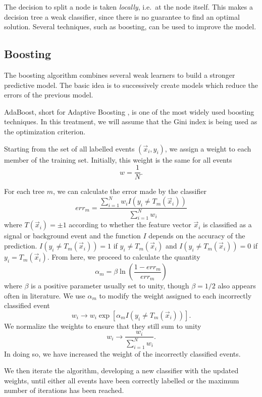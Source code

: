 \documentclass[10pt,a4paper]{book}
\begin{document}
The decision to split a node is taken \emph{locally}, i.e.\ at the node itself. This makes a decision tree a weak classifier, since there is no guarantee to find an optimal solution. Several techniques, such as boosting, can be used to improve the model. 

\subsection{Boosting}
The boosting algorithm combines several weak learners to build a stronger predictive model. The basic idea is to successively create models which reduce the errors of the previous model. 

AdaBoost, short for Adaptive Boosting \cite{Freund1996ExperimentsWA}, is one of the most widely used boosting techniques. In this treatment, we will assume that the Gini index is being used as the optimization criterion.

Starting from the set of all labelled events $(\vec{x}_i, y_i)$, we assign a weight to each member of the training set. Initially, this weight is the same for all events
\begin{equation}
w = \frac{1}{N}.
\end{equation}

For each tree $m$, we can calculate the error made by the classifier
\begin{equation}
err_m = \frac{\sum_{i= 1}^N w_i I(y_i \neq T_m(\vec{x}_i))}{\sum_{i =1}^N w_i}
\label{error}
\end{equation}
where $T(\vec{x}_i) = \pm 1$ according to whether the feature vector $\vec{x}_i$ is classified as a signal or background event and the function $I$ depends on the accuracy of the prediction. $I(y_i \neq T_m(\vec{x}_i)) = 1$ if $y_i \neq T_m(\vec{x}_i)$ and $I(y_i \neq T_m(\vec{x}_i)) = 0$ if $y_i = T_m(\vec{x}_i)$.
From here, we proceed to calculate the quantity
\begin{equation}
\alpha_m = \beta \ln \left( \frac{1 - err_m}{err_m} \right)
\end{equation}
where $\beta$ is a positive parameter usually set to unity, though $\beta = 1/2$ also appears often in literature. We use $\alpha_m$ to modify the weight assigned to each incorrectly classified event
\begin{equation}
w_i \rightarrow w_i \exp\left[\alpha_m I(y_i \neq T_m(\vec{x}_i)) \right].
\end{equation}
We normalize the weights to ensure that they still sum to unity
\begin{equation}
w_i \rightarrow \frac{w_i}{\sum_{i=1}^N w_i}.
\end{equation}
In doing so, we have increased the weight of the incorrectly classified events. 

We then iterate the algorithm, developing a new classifier with the updated weights, until either all events have been correctly labelled or the maximum number of iterations has been reached. 
\nocite{Yang2005StudiesOB}
\end{document}

